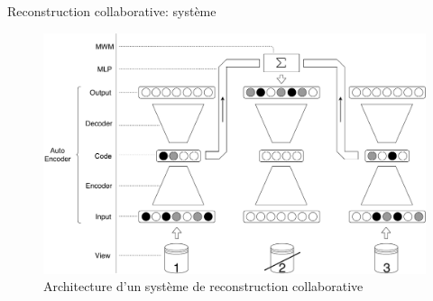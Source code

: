 \documentclass[hyperref={pdfpagelabels=false}]{beamer}
\begin{document}
    \begin{frame}{Reconstruction collaborative: système}
        \begin{figure}[h]
            \centering
            \includegraphics[scale=.28]{base_system.pdf}
            \caption{Architecture d'un système de reconstruction collaborative}
        \end{figure}
    \end{frame}
\end{document}
